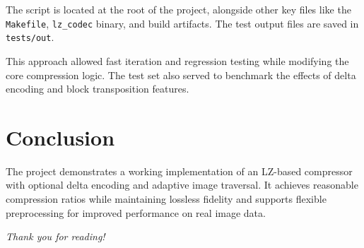 \documentclass[a4paper,12pt]{article}
\begin{document}
    The script is located at the root of the project, alongside other key files like the \texttt{Makefile}, \texttt{lz\_codec} binary, and build artifacts. The test output files are saved in \texttt{tests/out}.

    This approach allowed fast iteration and regression testing while modifying the core compression logic. The test set also served to benchmark the effects of delta encoding and block transposition features.



    \section{Conclusion}
    The project demonstrates a working implementation of an LZ-based compressor with optional delta encoding and adaptive image traversal. It achieves reasonable compression ratios while maintaining lossless fidelity and supports flexible preprocessing for improved performance on real image data.

    \vfill
    \begin{center}
        \textit{Thank you for reading!}
    \end{center}
\end{document}
